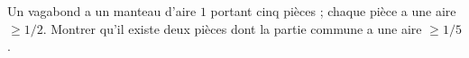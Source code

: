 Un vagabond a un manteau d'aire $1$ portant cinq pièces ; chaque pièce a une aire $\geq 1/2$. Montrer qu'il existe deux pièces dont la partie commune a une aire $\geq 1/5$.
